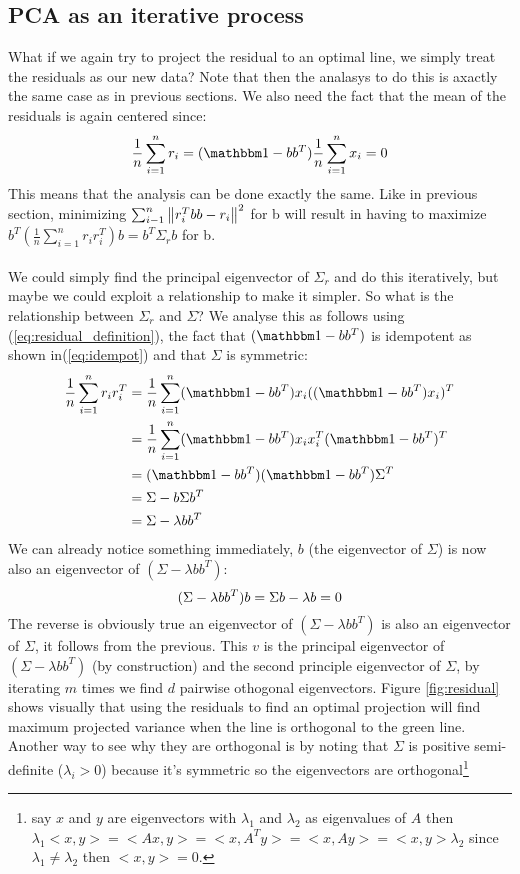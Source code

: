 		\subsection{PCA as an iterative process}
		What if we again try to project the residual to an optimal line, we simply treat the residuals as our new data? Note that then the analasys to do this is axactly the same case as in previous sections. We also need the fact that the mean of the residuals is again centered since:
		\begin{equation}
			\frac{1}{n}\sum_{i=1}^{n}r_i = (\ID - bb^T)\frac{1}{n}\sum_{i=1}^{n}x_i = 0
		\end{equation}
		This means that the analysis can be done exactly the same. Like in previous section, minimizing $\sum_{i-1}^{n}\left\lVert r_i^Tbb - r_i\right\rVert^2$ for b will result in having to maximize $b^T(\frac{1}{n}\sum_{i=1}^{n}r_ir_i^T)b = b^T\Sigma_rb$ for b. \\\\
		We could simply find the principal eigenvector of $\Sigma_r $ and do this iteratively, but maybe we could exploit a relationship to make it simpler. So what is the relationship between $\Sigma_r$ and $\Sigma$? We analyse this as follows using (\ref{eq:residual_definition}), the fact that $(\ID - bb^T)$ is idempotent as shown in(\ref{eq:idempot}) and that $\Sigma$ is symmetric:
		\begin{equation}
			\begin{split}
				\frac{1}{n}\sum_{i=1}^{n}r_ir_i^T &= \frac{1}{n}\sum_{i=1}^{n}(\ID - bb^T)x_i((\ID - bb^T)x_i)^T\\
					&= \frac{1}{n}\sum_{i=1}^{n}(\ID - bb^T)x_ix_i^T(\ID - bb^T)^T\\
					&= (\ID - bb^T)(\ID - bb^T)\Sigma^T\\	
					&= \Sigma - b\Sigma b^T\\
					&= \Sigma - \lambda bb^T			
			\end{split}
		\end{equation}
		We can already notice something immediately, $b$ (the eigenvector of $\Sigma$) is now also an eigenvector of $(\Sigma - \lambda bb^T)$:
		\begin{equation}
		(\Sigma - \lambda bb^T)b = \Sigma b - \lambda b = 0\\
		\end{equation}
		The reverse is obviously true an eigenvector of $(\Sigma - \lambda bb^T)$ is also an eigenvector of $\Sigma$, it follows from the previous.
		This $v$ is the principal eigenvector of $(\Sigma - \lambda bb^T)$ (by construction) and the second principle eigenvector of $\Sigma$, by iterating $m$ times we find $d$ pairwise othogonal eigenvectors. Figure \ref{fig:residual} shows visually that using the residuals to find an optimal projection will find maximum projected variance when the line is orthogonal to the green line. Another way to see why they are orthogonal is by noting that $\Sigma$ is positive semi-definite ($\lambda_i > 0$) because it's symmetric so the eigenvectors are orthogonal\footnote{say $x$ and $y$ are eigenvectors with $\lambda_1$ and $\lambda_2$ as eigenvalues of $A$ then $\lambda_1 <x,y> = <Ax,y> = <x,A^Ty> = <x,Ay>=<x,y>\lambda_2$ since $\lambda_1 \neq \lambda_2$ then $<x,y>=0$.}
